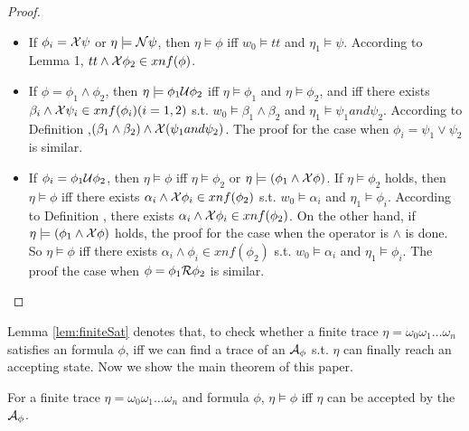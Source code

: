 \begin{proof}
\begin{enumerate}
\begin{itemize}
 		\item If $\phi_i=\mathcal{X} \psi$ or $\eta \models \mathcal{N} \psi$, then $\eta \models \phi$ iff $w_0 \models tt$ and $\eta_1 \models \psi$. According to Lemma 1, $tt \wedge \mathcal{X}\phi_2 \in xnf(\phi)$.\\
		\item If $\phi=\phi_1 \wedge \phi_2$, then $\eta \models \phi_1 \mathcal{U} \phi_2$ iff $\eta \models \phi_1$ and $\eta \models \phi_2$, and iff there exists $\beta_i \wedge \mathcal{X}\psi_i \in xnf(\phi_i)(i=1,2)$ s.t. $w_0 \models \beta_1 \wedge \beta_2$ and $\eta_1 \models \psi_1 and \psi_2$. According to Definition ,$(\beta_1 \wedge \beta_2)\wedge \mathcal{X}(\psi_1 and \psi_2)$. The proof for the case when $\phi_i=\psi_{1} \vee \psi_{2}$ is similar. \\
 		\item If $\phi_i=\phi_{1} \mathcal{U} \phi_{2}$, then $\eta \models \phi$ iff $\eta \models \phi_2$ or $\eta \models (\phi_1 \wedge \mathcal{X}\phi)$. If $\eta \models \phi_2$ holds, then $\eta \models \phi$ iff there exists $\alpha_i \wedge \mathcal{X}\phi_i \in xnf(\phi_2)$ s.t. $w_0 \models \alpha_i$ and $\eta_1 \models \phi_i$. According to Definition , there exists $\alpha_i \wedge \mathcal{X}\phi_i \in xnf(\phi_2)$. On the other hand, if $\eta \models (\phi_1 \wedge \mathcal{X}\phi)$ holds, the proof for the case when the operator is $\wedge$ is done. So $\eta \models \phi$ iff there exists $\alpha_i \wedge \phi_i \in xnf(\phi_2)$ s.t. $w_0 \models \alpha_i$ and $\eta_1 \models \phi_i$. The proof the case when $\phi=\phi_1 \mathcal{R} \phi_2$ is similar.
	\end{itemize}
\end{enumerate}

\end{proof}

Lemma \ref{lem:finiteSat} denotes that, to check whether a finite trace $\eta = \omega_0 \omega_1\ldots \omega_n$ satisfies an \ltlf formula $\phi$, iff we can find a trace of an \NFA $\mathcal{A}_\phi$ s.t. $\eta$ can finally reach an accepting state. Now we show the main theorem of this paper.

\begin{theorem}  
For a finite trace  $\eta = \omega_0\omega_1\ldots \omega_n $ and \ltlf formula $\phi$, $\eta \models \phi$ iff $\eta$ can be accepted by the \NFA $\mathcal{A}_\phi$.
\end{theorem}



